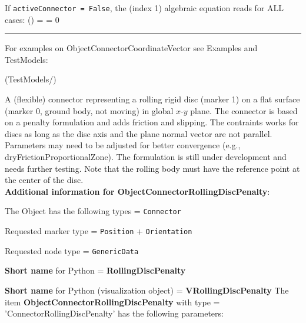     If \texttt{activeConnector = False}, the (index 1) algebraic equation reads for ALL cases:
    \be
      \cv(\tlambda) = \tlambda = 0
    \ee
\vspace{6pt}\par\noindent\rule{\textwidth}{0.4pt}
%
\noindent For examples on ObjectConnectorCoordinateVector see Examples and TestModels:
\bi
\item {} (TestModels/)
\ei

%
\newpage

\label{sec:item:ObjectConnectorRollingDiscPenalty}
A (flexible) connector representing a rolling rigid disc (marker 1) on a flat surface (marker 0, ground body, not moving) in global $x$-$y$ plane. The connector is based on a penalty formulation and adds friction and slipping. The contraints works for discs as long as the disc axis and the plane normal vector are not parallel. Parameters may need to be adjusted for better convergence (e.g., dryFrictionProportionalZone). The formulation is still under development and needs further testing. Note that the rolling body must have the reference point at the center of the disc.\vspace{12pt}
 \\{\bf Additional information for ObjectConnectorRollingDiscPenalty}:
\bi
  \item The Object has the following types = \texttt{Connector}
  \item Requested marker type = \texttt{Position} + \texttt{Orientation}
  \item Requested node type = \texttt{GenericData}
  \item {\bf Short name} for Python = {\bf RollingDiscPenalty}  \item {\bf Short name} for Python (visualization object) = {\bf VRollingDiscPenalty}\ei
\vspace{12pt} \noindent The item {\bf ObjectConnectorRollingDiscPenalty} with type = 'ConnectorRollingDiscPenalty' has the following parameters:\vspace{-1cm}\\ 
